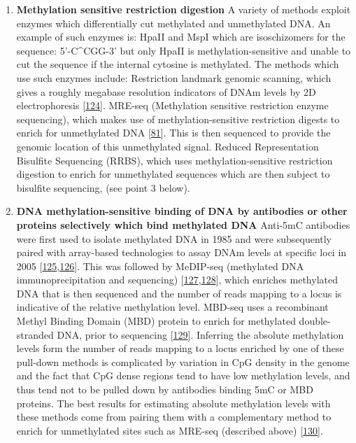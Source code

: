 \documentclass[
]{book}
\begin{document}
\begin{enumerate}
\def\labelenumi{\arabic{enumi}.}
\item
  \textbf{Methylation sensitive restriction digestion}
  A variety of methods exploit enzymes which differentially cut methylated and unmethylated DNA.
  An example of such enzymes is: HpaII and MspI which are isoschizomers for the sequence: 5'-C\^{}CGG-3' but only HpaII is methylation-sensitive and unable to cut the sequence if the internal cytosine is methylated.
  The methods which use such enzymes include: Restriction landmark genomic scanning, which gives a roughly megabase resolution indicators of DNAm levels by 2D electrophoresis {[}\protect\hyperlink{ref-Hatada1991}{124}{]}.
  MRE-seq (Methylation sensitive restriction enzyme sequencing), which makes use of methylation-sensitive restriction digests to enrich for unmethylated DNA {[}\protect\hyperlink{ref-Maunakea2010}{81}{]}.
  This is then sequenced to provide the genomic location of this unmethylated signal.
  Reduced Representation Bisulfite Sequencing (RRBS), which uses methylation-sensitive restriction digestion to enrich for unmethylated sequences which are then subject to bisulfite sequencing, (see point 3 below).
\item
  \textbf{DNA methylation-sensitive binding of DNA by antibodies or other proteins selectively which bind methylated DNA}
  Anti-5mC antibodies were first used to isolate methylated DNA in 1985 and were subsequently paired with array-based technologies to assay DNAm levels at specific loci in 2005 {[}\protect\hyperlink{ref-Weber2005}{125},\protect\hyperlink{ref-Harrison2011}{126}{]}.
  This was followed by MeDIP-seq (methylated DNA immunoprecipitation and sequencing) {[}\protect\hyperlink{ref-Down2009}{127},\protect\hyperlink{ref-Lienhard2014}{128}{]}, which enriches methylated DNA that is then sequenced and the number of reads mapping to a locus is indicative of the relative methylation level.
  MBD-seq uses a recombinant Methyl Binding Domain (MBD) protein to enrich for methylated double-stranded DNA, prior to sequencing {[}\protect\hyperlink{ref-Serre2009a}{129}{]}.
  Inferring the absolute methylation levels form the number of reads mapping to a locus enriched by one of these pull-down methods is complicated by variation in CpG density in the genome and the fact that CpG dense regions tend to have low methylation levels, and thus tend not to be pulled down by antibodies binding 5mC or MBD proteins.
  The best results for estimating absolute methylation levels with these methods come from pairing them with a complementary method to enrich for unmethylated sites such as MRE-seq (described above) {[}\protect\hyperlink{ref-Li2015}{130}{]}.

\end{enumerate}
\end{document}

